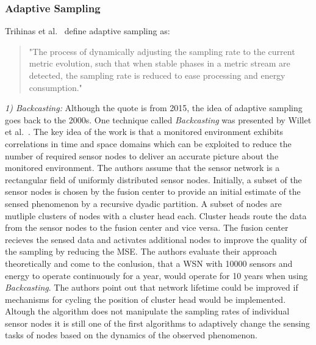 \subsubsection{Adaptive Sampling}
\label{sec:Adaptive Sampling}

Trihinas et al.~\cite{trihinas2015adam} define adaptive sampling as:

\begin{quote}
    "The process of dynamically adjusting the sampling rate to the current
    metric evolution, such that when stable phases in a metric stream are
    detected, the sampling rate is reduced to ease processing and energy
    consumption."
\end{quote}

\par
\textit{1) Backcasting:}
Although the quote is from 2015, the idea of adaptive sampling goes back to the
2000s. One technique called \textit{Backcasting} was presented by Willet et
al.~\cite{willett2004backcasting}. The key idea of the work is that a monitored
environment exhibits correlations in time and space domains which can be
exploited to reduce the number of required sensor nodes to deliver an accurate
picture about the monitored environment. The authors assume that the sensor
network is a rectangular field of uniformly distributed sensor nodes.
Initially, a subset of the sensor nodes is chosen by the fusion center to
provide an initial estimate of the sensed phenomenon by a recursive dyadic
partition. A subset of nodes are mutliple clusters of nodes with a cluster head
each. Cluster heads route the data from the sensor nodes to the fusion center
and vice versa. The fusion center recieves the sensed data and activates
additional nodes to improve the quality of the sampling by reducing the
\ac{MSE}. The authors evaluate their approach theoretically and come to the
conlusion, that a \ac{WSN} with 10000 sensors and energy to operate
continuously for a year, would operate for 10 years when using
\textit{Backcasting}. The authors point out that network lifetime could be
improved if mechanisms for cycling the position of cluster head would be
implemented. Altough the algorithm does not manipulate the sampling rates of
individual sensor nodes it is still one of the first algorithms to adaptively
change the sensing tasks of nodes based on the dynamics of the observed
phenomenon.

\par

